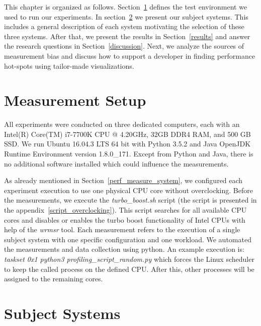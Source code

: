 This chapter is organized as follows. Section~\ref{test_env} defines the test environment we used to run our experiments. In section~\ref{subject_systems} we present our subject systems. This includes a general description of each system motivating the selection of these three systems. After that, we present the  results in Section~\ref{results} and answer the research questions in Section~\ref{discussion}. Next, we analyze the sources of measurement bias and discuss how to support a developer in finding performance hot-spots using tailor-made visualizations.


\section{Measurement Setup}
\label{test_env}

All experiments were conducted on three dedicated computers, each with an Intel(R) Core(TM) i7-7700K CPU @ 4.20GHz, 32GB DDR4 RAM, and 500 GB SSD. We run Ubuntu 16.04.3 LTS 64 bit with Python 3.5.2 and Java OpenJDK Runtime Environment version 1.8.0\_171. Except from Python and Java, there is no additional software installed which could influence the measurements. 

As already mentioned in Section~\ref{perf_measure_system}, we configured each experiment execution to use one physical CPU core without overclocking. Before the measurements, we execute the \emph{turbo\_boost.sh} script (the script is presented in the appendix~\ref{script_overclocking}). This script searches for all available CPU cores and disables or enables the turbo boost functionality of Intel CPUs with help of the \emph{wrmsr} tool. Each measurement refers to the execution of a single subject system with one specific configuration and one workload. We automated the measurements and data collection using python. An example execution is: \emph{taskset 0x1 python3 profiling\_script\_random.py} which forces the Linux scheduler to keep the called process on the defined CPU. After this, other processes will be assigned to the remaining cores.



\section{Subject Systems}
\label{subject_systems}

